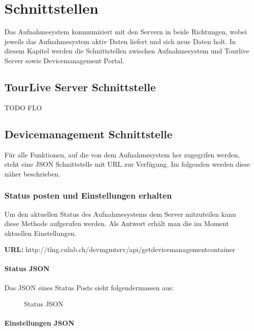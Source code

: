 \chapter{Schnittstellen}

Das Aufnahmesystem kommuniziert mit den Servern in beide Richtungen, wobei jeweils das Aufnahmesystem aktiv Daten liefert und sich neue Daten holt. In diesem Kapitel werden die Schnittstellen zwischen Aufnahmesystem und Tourlive Server sowie Devicemanagement Portal.

\section{TourLive Server Schnittstelle}

TODO FLO

\section{Devicemanagement Schnittstelle}

Für alle Funktionen, auf die von dem Aufnahmesystem her zugegrifen werden, steht eine JSON Schnittstelle mit URL zur Verfügung. Im folgenden werden diese näher beschrieben.

\subsection{Status posten und Einstellungen erhalten}

Um den aktuellen Status des Aufnahmesystems dem Server mitzuteilen kann diese Methode aufgerufen werden. Als Antwort erhält man die im Moment aktuellen Einstellungen.

{\bf URL: }http://tlng.cnlab.ch/devmgmtsrv/api/getdevicemanagementcontainer 

\subsubsection{Status JSON}

Das JSON eines Status Posts sieht folgendermassen aus:

\begin{figure}[H]
	\centering
	\caption{Status JSON}
	
\end{figure}


\subsubsection{Einstellungen JSON}

